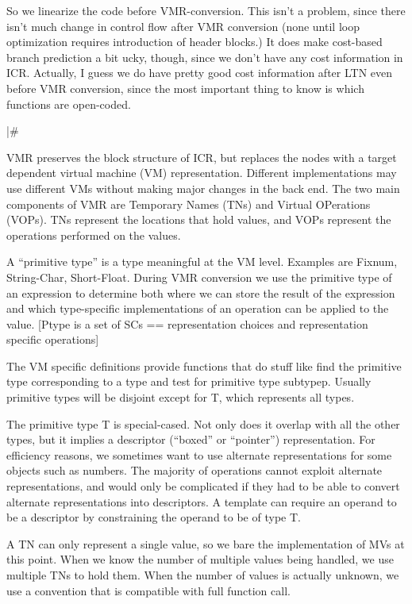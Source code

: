 So we linearize the code before VMR-conversion.  This isn't a problem,
since there isn't much change in control flow after VMR conversion (none until
loop optimization requires introduction of header blocks.)  It does make
cost-based branch prediction a bit ucky, though, since we don't have any cost
information in ICR.  Actually, I guess we do have pretty good cost information
after LTN even before VMR conversion, since the most important thing to know is
which functions are open-coded.

|\#

VMR preserves the block structure of ICR, but replaces the nodes with a target
dependent virtual machine (VM) representation.  Different implementations may
use different VMs without making major changes in the back end.  The two main
components of VMR are Temporary Names (TNs) and Virtual OPerations (VOPs).  TNs
represent the locations that hold values, and VOPs represent the operations
performed on the values.

A ``primitive type'' is a type meaningful at the VM level.  Examples are Fixnum,
String-Char, Short-Float.  During VMR conversion we use the primitive type of
an expression to determine both where we can store the result of the expression
and which type-specific implementations of an operation can be applied to the
value.  [Ptype is a set of SCs == representation choices and representation
specific operations]

The VM specific definitions provide functions that do stuff like find the
primitive type corresponding to a type and test for primitive type subtypep.
Usually primitive types will be disjoint except for T, which represents all
types.

The primitive type T is special-cased.  Not only does it overlap with all the
other types, but it implies a descriptor (``boxed'' or ``pointer'') representation.
For efficiency reasons, we sometimes want to use
alternate representations for some objects such as numbers.  The majority of
operations cannot exploit alternate representations, and would only be
complicated if they had to be able to convert alternate representations into
descriptors.  A template can require an operand to be a descriptor by
constraining the operand to be of type T.

A TN can only represent a single value, so we bare the implementation of MVs at
this point.  When we know the number of multiple values being handled, we use
multiple TNs to hold them.  When the number of values is actually unknown, we
use a convention that is compatible with full function call.

